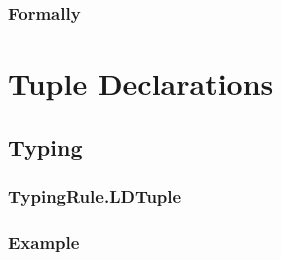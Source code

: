 \subsubsection{Formally}
\begin{mathpar}
\end{mathpar}

\begin{mathpar}
\end{mathpar}

\section{Tuple Declarations\label{sec:TupleDeclarations}}
\subsection{Typing}
\subsubsection{TypingRule.LDTuple\label{sec:TypingRule.LDTuple}}
\subsubsection{Example}

